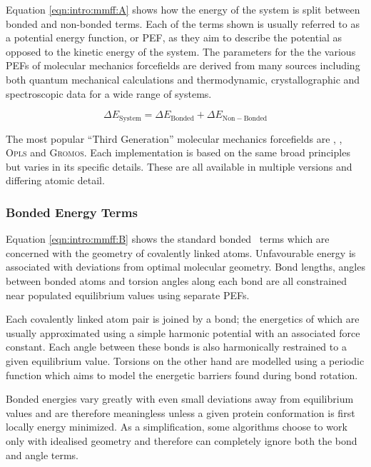 Equation \ref{eqn:intro:mmff:A} shows how the energy of the system is split between bonded and non-bonded terms.
Each of the terms shown is usually referred to as a potential energy function,
or PEF, as they aim to describe the potential as opposed to the kinetic energy
of the system. The parameters for the the various PEFs of molecular mechanics
forcefields are derived from many sources including both quantum mechanical calculations and thermodynamic, crystallographic and spectroscopic data for a wide range of systems\cite{FORCEFIELD:REVIEW:3,FORCEFIELD:REVIEW:4}.

\begin{equation}
\Delta E_\mathrm{System} = \Delta E_\mathrm{Bonded} + \Delta E_\mathrm{Non-Bonded}
\label{eqn:intro:mmff:A}
\end{equation}

The most popular ``Third Generation'' molecular mechanics forcefields are \amber\cite{FORCEFIELD:AMBER,COMPCHEM:Pon2003},
\charmm\cite{FORCEFIELD:CHARMM}, \textsc{Opls}\cite{COMPCHEM:OPLS,COMPCHEM:OPLS:B} and \textsc{Gromos}\cite{COMPCHEM:GROMOS}. Each implementation is based on the
same broad principles but varies in its specific details. These are all available in multiple versions and differing atomic detail.

\subsubsection{Bonded Energy Terms}
\label{section:protmodel:bondedterms}

Equation \ref{eqn:intro:mmff:B} shows the standard bonded \forcefield\ terms
which are concerned with the geometry of covalently linked atoms. Unfavourable energy is associated with deviations from optimal molecular geometry. Bond lengths, angles between bonded atoms and torsion angles along each bond are all constrained near populated equilibrium values using separate PEFs. 

Each covalently linked atom pair is joined by a bond; the energetics of 
which are usually
approximated
using a simple harmonic potential with an associated force constant. Each angle between these bonds
is also harmonically
restrained  to a given equilibrium value. Torsions on the other hand are modelled using a periodic function which aims to model the energetic barriers found during bond rotation. 

Bonded energies vary greatly with even small deviations away from equilibrium
values and are therefore meaningless unless a given protein conformation
is first locally energy minimized. As a simplification, some algorithms choose to work only with idealised geometry and therefore can completely ignore
both the bond and angle terms.


